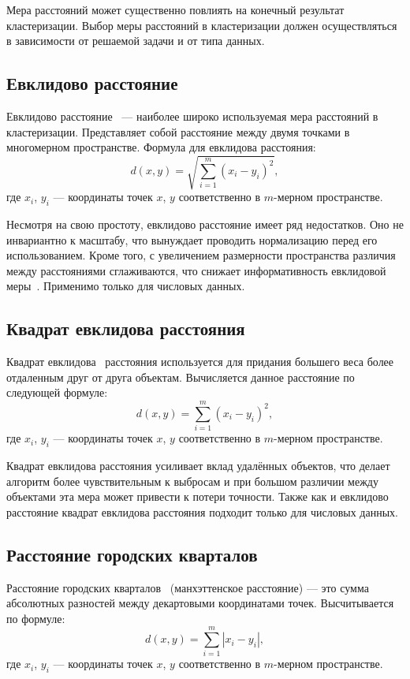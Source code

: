 Мера расстояний может существенно повлиять на конечный результат кластеризации. Выбор меры расстояний в кластеризации должен осуществляться в зависимости от решаемой задачи и от типа данных. 

\subsection{Евклидово расстояние}
Евклидово расстояние~\cite{Clast} --- наиболее широко используемая мера расстояний в кластеризации. Представляет собой расстояние между двумя точками в многомерном пространстве. Формула для евклидова расстояния:
\begin{equation}
	d(x, y) = \sqrt{\sum_{i=1}^m{{(x_i - y_i)}^2}},
\end{equation}
где $x_i$, $y_i$ --- координаты точек $x$, $y$ соответственно в $m$-мерном пространстве.

Несмотря на свою простоту, евклидово расстояние имеет ряд недостатков. Оно не инвариантно к масштабу, что вынуждает проводить нормализацию перед его использованием. Кроме того, с увеличением размерности пространства различия между расстояниями сглаживаются, что снижает информативность евклидовой меры~\cite{Evklid_problem}. Применимо только для числовых данных.

\subsection{Квадрат евклидова расстояния}
Квадрат евклидова~\cite{Clast} расстояния используется для придания большего веса более отдаленным друг от друга объектам. Вычисляется данное расстояние по следующей формуле:
\begin{equation}
	d(x, y) = \sum_{i=1}^m{{(x_i - y_i)}^2},
\end{equation}
где $x_i$, $y_i$ --- координаты точек $x$, $y$ соответственно в $m$-мерном пространстве.

Квадрат евклидова расстояния усиливает вклад удалённых объектов, что делает алгоритм более чувствительным к выбросам и при большом различии между объектами эта мера может привести к потери точности. Также как и евклидово расстояние квадрат евклидова расстояния подходит только для числовых данных.

\subsection{Расстояние городских кварталов}
Расстояние городских кварталов~\cite{Clast} (манхэттенское расстояние) --- это сумма абсолютных разностей между декартовыми координатами точек. Высчитывается по формуле:
\begin{equation}
	d(x, y) = \sum_{i=1}^m{|x_i - y_i|},
\end{equation}
где $x_i$, $y_i$ --- координаты точек $x$, $y$ соответственно в $m$-мерном пространстве.

